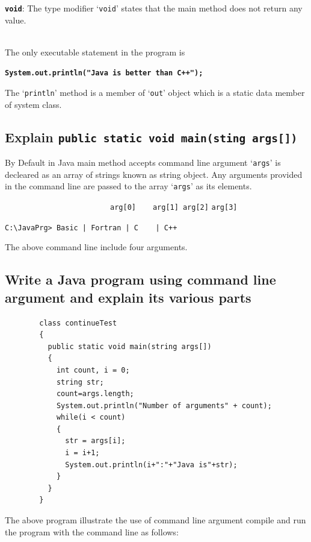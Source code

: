 \documentclass[11pt, a4paper]{book}
\begin{document}
      \large \texttt{\textbf{void}}\normalsize: The type modifier `\texttt{void}' states that the main method does not  return any value.
      
      \ \\
      The only executable statement in the program is 
      
      \large \texttt{\textbf{System.out.println("Java is better than C++");}}\normalsize 
      
      The `\texttt{println}' method is a member of `\texttt{out}' object which is a static data member of system class.
    
    
    \subsection{Explain \texttt{public static void main(sting args[])}}
      By Default in Java main method accepts command line argument `\texttt{args}' is decleared as an array of strings known as string object. Any arguments provided in the command line are passed to the array `\texttt{args}' as its elements.
      
      \ \ \ \ \ \ \ \ \ \ \ \ \ \ \ \ \ \ \ \ \ \ \ \ \ \texttt{arg[0]}\ \ \ \ \texttt{arg[1]}\ \texttt{arg[2]} \texttt{arg[3]}
      
      \Large \texttt{C:\textbackslash JavaPrg> \small Basic | Fortran | C\ \ \ \ | C++}\normalsize
      
      The above command line include four arguments.
    
    \subsection{Write a Java program using command line argument and explain its various parts}
      \begin{lstlisting}
        class continueTest
        {
          public static void main(string args[])
          {
            int count, i = 0;
            string str;
            count=args.length;
            System.out.println("Number of arguments" + count);
            while(i < count)
            {
              str = args[i];
              i = i+1;
              System.out.println(i+":"+"Java is"+str);
            }
          }
        }
      \end{lstlisting}
      
      The above program illustrate the use of command line argument compile and run the program with the command line as follows:
      
\end{document}

